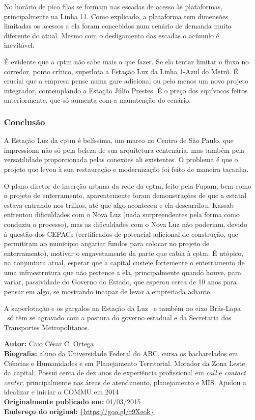 \documentclass[11pt,fleqn]{book} %
\newcommand{\infocaio}[2]{\textbf{Autor:} Caio C\'{e}sar C. Ortega \\ \textbf{Biografia:} aluno da Universidade Federal do ABC, cursa os bacharelados em Ci\^{e}ncias e Humanidades e em Planejamento Territorial. Morador da Zona Leste da capital. Possui cerca de dez anos de experi\^{e}ncia profissional em \textit{call} e \textit{contact center}, principalmente nas \'{a}reas de atendimento, planejamento e MIS. Ajudou a idealizar e iniciar o COMMU em 2014 \\ \textbf{Originalmente publicado em:} {#1} \\ \textbf{Endere\c{c}o do original:} \url{{#2}}}
\begin{document}
No horário de pico filas se formam nas escadas de acesso às plataformas, principalmente na Linha 11. Como explicado, a plataforma tem dimensões limitadas os acessos a ela foram concebidos num cenário de demanda muito diferente do atual. Mesmo com o desligamento das escadas o acúmulo é inevitável.

É evidente que a \gls{cptm} não sabe mais o que fazer. Se ela tentar limitar o fluxo no corredor, ponto crítico, superlota a Estação Luz da Linha 1-Azul do Metrô. É crucial que a empresa pense numa gare adicional ou pelo menos um novo projeto integrador, contemplando a Estação Júlio Prestes. É o preço dos equívocos feitos anteriormente, que só aumenta com a manutenção do cenário.

\subsubsection{Conclusão}

A Estação Luz da \gls{cptm} é belíssima, um marco no Centro de São Paulo, que impressiona não só pela beleza de sua arquitetura centenária, mas também pela versatilidade proporcionada pelas conexões ali existentes. O problema é que o projeto que levou à sua restauração e modernização foi feito de maneira tacanha.

O plano diretor de inserção urbana da rede da \gls{cptm}, feito pela Fupam, bem como o projeto de enterramento, aparentemente foram demonstrações de que a estatal estava entrando nos trilhos, até que algo aconteceu e ela descarrilou. Kassab enfrentou dificuldades com o Nova Luz (nada surpreendentes pela forma como conduziu o processo), mas as dificuldades com o Nova Luz não poderiam, devido à questão dos CEPACs (certificados de potencial adicional de construção, que permitiram ao município angariar fundos para colocar no projeto de enterramento), motivar o engavetamento da parte que cabia à \gls{cptm}. É utópico, na conjuntura atual, esperar que a capital custeie fortemente o enterramento de uma infraestrutura que não pertence a ela, principalmente quando houve, para variar, passividade do Governo do Estado, que esperou cerca de 10 anos para pensar em algo, se mostrando incapaz de levar a empreitada adiante.

A superlotação e os gargalos na Estação da Luz \textemdash\ e também no eixo Brás-Lapa \textemdash\ só têm se agravado com a postura do governo estadual e da Secretaria dos Transportes Metropolitanos.

\begin{info}
	\infocaio{01/03/2015}{https://goo.gl/r9Xeok}
\end{info}
\end{document}
